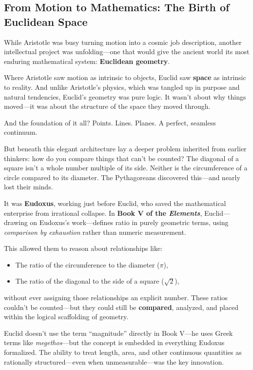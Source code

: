 \subsection{From Motion to Mathematics: The Birth of Euclidean Space}

While Aristotle was busy turning motion into a cosmic job description, another intellectual project was unfolding—one that would give the ancient world its most enduring mathematical system: \textbf{Euclidean geometry}.

Where Aristotle saw motion as intrinsic to objects, Euclid saw \textbf{space} as intrinsic to reality. And unlike Aristotle’s physics, which was tangled up in purpose and natural tendencies, Euclid’s geometry was pure logic. It wasn’t about why things moved—it was about the structure of the space they moved through.

And the foundation of it all? Points. Lines. Planes. A perfect, seamless continuum.

\medskip

But beneath this elegant architecture lay a deeper problem inherited from earlier thinkers: how do you compare things that can’t be counted? The diagonal of a square isn’t a whole number multiple of its side. Neither is the circumference of a circle compared to its diameter. The Pythagoreans discovered this—and nearly lost their minds.

It was \textbf{Eudoxus}, working just before Euclid, who saved the mathematical enterprise from irrational collapse. In \textbf{Book V of the \textit{Elements}}, Euclid—drawing on Eudoxus’s work—defines ratio in purely geometric terms, using \textit{comparison by exhaustion} rather than numeric measurement.

This allowed them to reason about relationships like:

\begin{itemize}
    \item The ratio of the circumference to the diameter (\( \pi \)),
    \item The ratio of the diagonal to the side of a square (\( \sqrt{2} \)),
\end{itemize}

without ever assigning those relationships an explicit number. These ratios couldn’t be counted—but they could still be \textbf{compared}, analyzed, and placed within the logical scaffolding of geometry.

Euclid doesn’t use the term “magnitude” directly in Book V—he uses Greek terms like \textit{megethos}—but the concept is embedded in everything Eudoxus formalized. The ability to treat length, area, and other continuous quantities as rationally structured—even when unmeasurable—was the key innovation.

